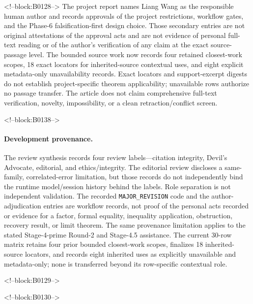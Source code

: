 \documentclass[11pt]{article}
\begin{document}
<!--block:B0128-->
The project report names Liang Wang as the responsible human author and records
approvals of the project restrictions, workflow gates, and the Phase-6
falsification-first design choice. Those secondary entries are not original
attestations of the approval acts and are not evidence of personal full-text
reading or of the author's verification of any claim at the exact source-passage
level.
The bounded source work now records four retained closest-work scopes, 18 exact
locators for inherited-source contextual uses, and eight explicit metadata-only
unavailability records. Exact locators and support-excerpt digests do not establish
project-specific theorem applicability; unavailable rows authorize no passage
transfer. The article does not claim comprehensive full-text verification, novelty,
impossibility, or a clean retraction/conflict screen.

<!--block:B0138-->
\begingroup\sloppy
\paragraph{Development provenance.} The review synthesis records four review
labels---citation integrity, Devil's Advocate, editorial, and ethics/integrity.
The editorial review discloses a same-family, correlated-error limitation, but
those records do not independently bind the runtime model/session history behind
the labels. Role separation is not independent validation. The recorded
\texttt{MAJOR\_REVISION} code and the author-adjudication entries are workflow
records, not proof of the personal acts recorded or evidence for a factor, formal
equality, inequality application, obstruction, recovery result, or limit theorem.
The same provenance limitation applies to the stated Stage-4-prime Round-2 and
Stage-4.5 assistance. The current 30-row
matrix retains four prior bounded closest-work scopes, finalizes 18 inherited-source
locators, and records eight inherited uses as explicitly unavailable and
metadata-only; none is transferred beyond its row-specific contextual role.
\par\endgroup

<!--block:B0129-->



<!--block:B0130-->
\end{document}

